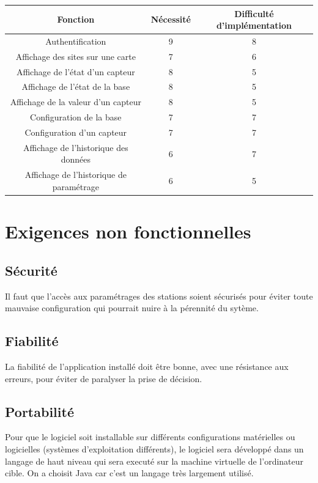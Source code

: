 \begin{tabular}{|c|c|c|}
	\hline Fonction & Nécessité & Difficulté d'implémentation\\
	\hline 
	 Authentification & 9 & 8\\
	 Affichage des sites sur une carte & 7 & 6\\
	 Affichage de l'état d'un capteur & 8 & 5\\
	 Affichage de l'état de la base & 8 & 5\\
	 Affichage de la valeur d'un capteur & 8 & 5\\
	 Configuration de la base & 7 & 7\\
	 Configuration d'un capteur & 7 & 7\\
	 Affichage de l'historique des données & 6 & 7\\
	 Affichage de l'historique de paramétrage & 6 & 5\\
	\hline
\end{tabular}


\section{Exigences non fonctionnelles}
\subsection{Sécurité}
Il faut que l'accès aux paramétrages des stations soient sécurisés pour éviter toute mauvaise configuration qui pourrait nuire à la pérennité du sytème.

\subsection{Fiabilité}
La fiabilité de l'application installé doit être bonne, avec une résistance aux erreurs, pour éviter de paralyser la prise de décision.

\subsection{Portabilité}
Pour que le logiciel soit installable sur différents configurations matérielles ou logicielles (systèmes d'exploitation différents), le logiciel sera développé dans un langage de haut niveau qui sera executé sur la machine virtuelle de l'ordinateur cible. On a choisit Java car c'est un langage très largement utilisé.


